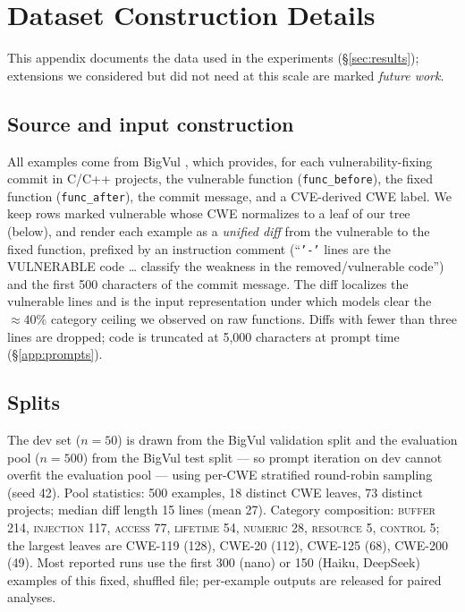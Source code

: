 \section{Dataset Construction Details}
\label{app:data}

This appendix documents the data used in the experiments
(\S\ref{sec:results}); extensions we considered but did not need at this scale
are marked \emph{future work}.

\subsection{Source and input construction}
All examples come from BigVul \citep{fan2020bigvul}, which provides, for
each vulnerability-fixing commit in C/C++ projects, the vulnerable function
(\texttt{func\_before}), the fixed function (\texttt{func\_after}), the commit
message, and a CVE-derived CWE label. We keep rows marked vulnerable whose CWE
normalizes to a leaf of our tree (below), and render each example as a
\emph{unified diff} from the vulnerable to the fixed function, prefixed by an
instruction comment (``\texttt{'-'} lines are the VULNERABLE code \ldots
classify the weakness in the removed/vulnerable code'') and the first 500
characters of the commit message. The diff localizes the vulnerable lines and is
the input representation under which models clear the $\approx\!40\%$ category
ceiling we observed on raw functions. Diffs with fewer than three lines are
dropped; code is truncated at 5{,}000 characters at prompt time
(\S\ref{app:prompts}).

\subsection{Splits}
The dev set ($n{=}50$) is drawn from the BigVul validation split and the evaluation pool
($n{=}500$) from the BigVul test split --- so prompt iteration on dev cannot
overfit the evaluation pool --- using per-CWE stratified round-robin sampling (seed 42).
Pool statistics: 500 examples, 18 distinct CWE leaves, 73 distinct projects;
median diff length 15 lines (mean 27). Category composition:
\textsc{buffer} 214, \textsc{injection} 117, \textsc{access} 77,
\textsc{lifetime} 54, \textsc{numeric} 28, \textsc{resource} 5,
\textsc{control} 5; the largest leaves are CWE-119 (128), CWE-20 (112),
CWE-125 (68), CWE-200 (49). Most reported runs use the first 300 (nano) or 150
(Haiku, DeepSeek) examples of this fixed, shuffled file; per-example outputs are
released for paired analyses.

